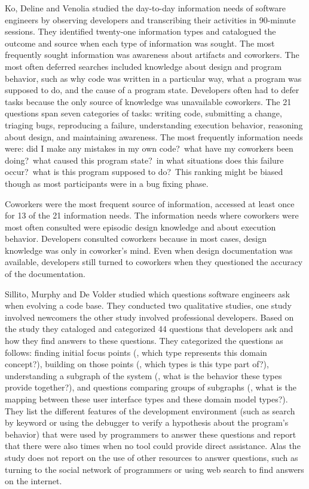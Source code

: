 Ko, Deline and Venolia \cite{Ko07a} studied the day-to-day information needs of software engineers by observing developers and transcribing their activities in 90-minute sessions. They identified twenty-one information types and catalogued the outcome and source when each type of information was sought. The most frequently sought information was awareness about artifacts and coworkers. The most often deferred searches included knowledge about design and program behavior, such as why code was written in a particular way, what a program was supposed to do, and the cause of a program state. Developers often had to defer tasks because the only source of knowledge was unavailable coworkers.  The 21 questions span seven categories of tasks: writing code, submitting a change, triaging bugs, reproducing a failure, understanding execution behavior, reasoning about design, and maintaining awareness. The most frequently information needs were: did I make any mistakes in my own code?~what have my coworkers been doing?~what caused this program state?~in what situations does this failure occur?~what is this program supposed to do?~This ranking might be biased though as most participants were in a bug fixing phase. 

Coworkers were the most frequent source of information, accessed at least once for 13 of the 21 information needs. The information needs where coworkers were most often consulted were episodic design knowledge and about execution behavior. Developers consulted coworkers because in most cases, design knowledge was only in coworker's mind. Even when design documentation was available, developers still turned to coworkers when they questioned the accuracy of the documentation.

Sillito, Murphy and De Volder \cite{Sill06a} studied which questions software engineers ask when evolving a code base. They conducted two qualitative studies, one study involved newcomers the other study involved professional developers. Based on the study they cataloged and categorized 44 questions that developers ask and how they find answers to these questions. They categorized the questions as follows: finding initial focus points (\eg, which type represents this domain concept?), building on those points (\eg, which types is this type part of?), understanding a subgraph of the system (\eg, what is the behavior these types provide together?), and questions comparing groups of subgraphs (\eg, what is the mapping between these user interface types and these domain model types?). They list the different features of the development environment (such as search by keyword or using the debugger to verify a hypothesis about the program's behavior) that were used by programmers to answer these questions and report that there were also times when no tool could provide direct assistance. Alas the study does not report on the use of other resources to answer questions, such as turning to the social network of programmers or using web search to find answers on the internet. 

